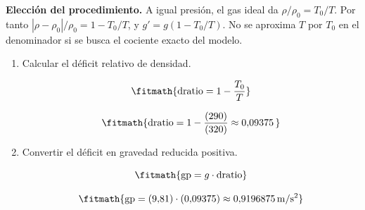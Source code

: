 \noindent\textbf{Elección del procedimiento.} A igual presión, el gas ideal da $\rho/\rho_0=T_0/T$. Por tanto $|\rho-\rho_0|/\rho_0=1-T_0/T$, y $g\prime=g(1-T_0/T)$. No se aproxima $T$ por $T_0$ en el denominador si se busca el cociente exacto del modelo.

\begin{enumerate}

\item Calcular el déficit relativo de densidad.

\[\fitmath{\mathrm{dratio}=1-\frac{T_{0}}{T}}\]

\[\fitmath{\mathrm{dratio}=1-\frac{(290)}{(320)}\approx 0{,}09375\,}\]

\item Convertir el déficit en gravedad reducida positiva.

\[\fitmath{\mathrm{gp}=g\cdot \mathrm{dratio}}\]

\[\fitmath{\mathrm{gp}=(9{,}81)\cdot (0{,}09375)\approx 0{,}9196875\,\mathrm{m/s^{2}}}\]

\end{enumerate}
